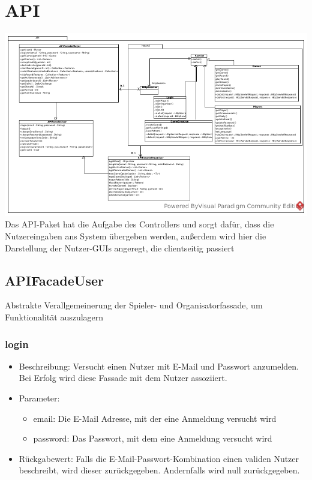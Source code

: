 \documentclass[a4paper]{scrreprt}
\begin{document}
	\section{API}
	\includegraphics[width=\textwidth]{img/package/api.pdf}
	Das API-Paket hat die Aufgabe des Controllers und sorgt dafür, dass die Nutzereingaben ans System übergeben werden, außerdem wird hier die Darstellung der Nutzer-GUIs angeregt, die clientseitig passiert
	
	\subsection{APIFacadeUser}
	Abstrakte Verallgemeinerung der Spieler- und Organisatorfassade, um Funktionalität auszulagern
	\subsubsection{login}
		\begin{itemize}
			\item Beschreibung: Versucht einen Nutzer mit E-Mail und Passwort anzumelden. Bei Erfolg wird diese Fassade mit dem Nutzer assoziiert.
			\item Parameter:
			\begin{itemize}
				\item email: Die E-Mail Adresse, mit der eine Anmeldung versucht wird
				\item password: Das Passwort, mit dem eine Anmeldung versucht wird
			\end{itemize}
			\item Rückgabewert: Falls die E-Mail-Passwort-Kombination einen validen Nutzer beschreibt, wird dieser zurückgegeben. Andernfalls wird null zurückgegeben.
		\end{itemize}
\end{document}
